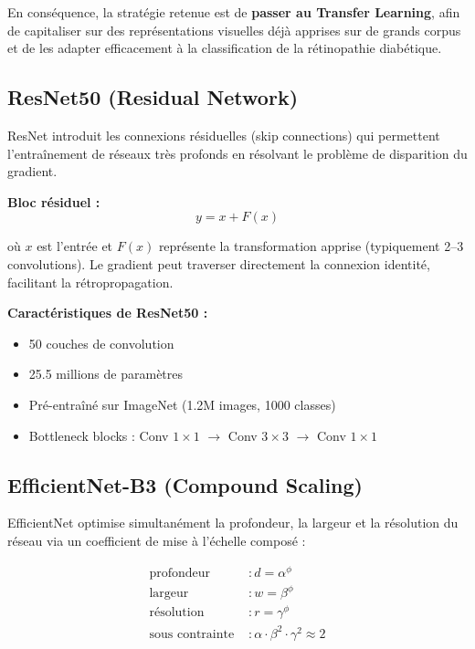 \documentclass[12pt,a4paper,oneside]{report}
\begin{document}
En conséquence, la stratégie retenue est de \textbf{passer au Transfer
Learning}, afin de capitaliser sur des représentations visuelles déjà
apprises sur de grands corpus et de les adapter efficacement à la
classification de la rétinopathie diabétique.

\subsection{ResNet50 (Residual Network)}

ResNet \cite{he2016deep} introduit les connexions résiduelles (skip connections)
qui permettent l'entraînement de réseaux très profonds en résolvant le
problème de disparition du gradient.

\textbf{Bloc résiduel :}
\begin{equation}
y = x + F(x)
\label{eq:residual}
\end{equation}

où $x$ est l'entrée et $F(x)$ représente la transformation apprise
(typiquement 2--3 convolutions). Le gradient peut traverser directement
la connexion identité, facilitant la rétropropagation.

\textbf{Caractéristiques de ResNet50 :}
\begin{itemize}
    \item 50 couches de convolution
    \item 25.5 millions de paramètres
    \item Pré-entraîné sur ImageNet (1.2M images, 1000 classes)
    \item Bottleneck blocks : Conv $1\times1$ $\rightarrow$ Conv $3\times3$
          $\rightarrow$ Conv $1\times1$
\end{itemize}

\subsection{EfficientNet-B3 (Compound Scaling)}

EfficientNet \cite{tan2019efficientnet} optimise simultanément la profondeur,
la largeur et la résolution du réseau via un coefficient de mise à l'échelle
composé :

\begin{align}
\text{profondeur} &: d = \alpha^\phi \\
\text{largeur} &: w = \beta^\phi \\
\text{résolution} &: r = \gamma^\phi \\
\text{sous contrainte } &: \alpha \cdot \beta^2 \cdot \gamma^2 \approx 2
\label{eq:efficientnet}
\end{align}
\end{document}
